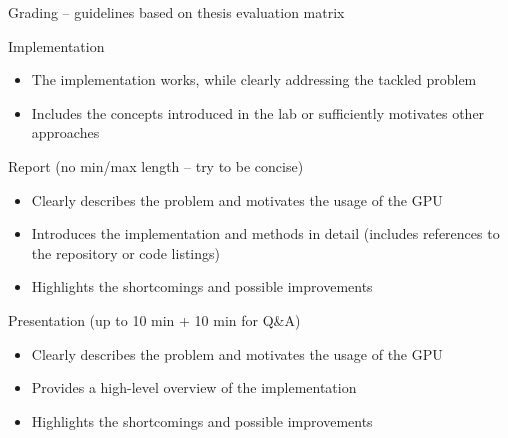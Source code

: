 \documentclass[11pt,t]{beamer}
\begin{document}
\begin{frame}{Grading -- guidelines based on thesis evaluation matrix} 

\vspace{-2mm}

Implementation
{\small
\begin{itemize}
    \item The implementation works, while clearly addressing the tackled problem
    \item Includes the concepts introduced in the lab or sufficiently motivates other approaches
\end{itemize}
}

\vspace{1mm}

Report (no min/max length -- try to be concise)
{\small
\begin{itemize}
    \item Clearly describes the problem and motivates the usage of the GPU
    \item Introduces the implementation and methods in detail (includes references to the repository or code listings)
    \item Highlights the shortcomings and possible improvements
\end{itemize}
}

\vspace{1mm}

Presentation (up to 10 min + 10 min for Q\&A)
{\small
\begin{itemize}
    \item Clearly describes the problem and motivates the usage of the GPU
    \item Provides a high-level overview of the implementation
    \item Highlights the shortcomings and possible improvements
\end{itemize}
}

\end{frame}
\end{document}
